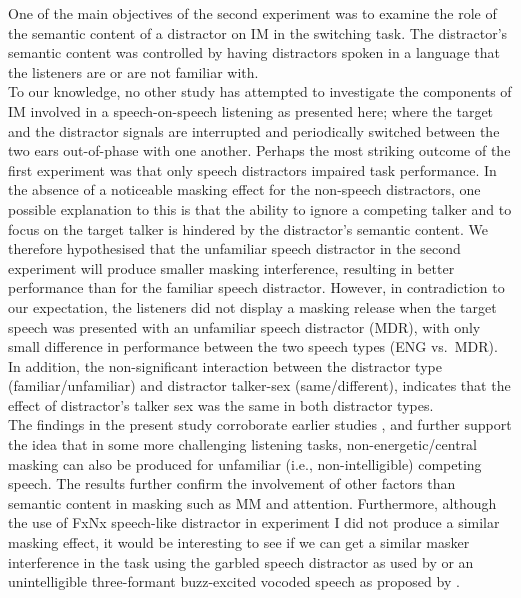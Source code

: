 \documentclass[a4paper, twoside]{templates/ociamthesis}
\begin{document}
\hfill\break
One of the main objectives of the second experiment was to examine the role of the semantic content of a distractor on IM in the switching task. The distractor's semantic content was controlled by having distractors spoken in a language that the listeners are or are not familiar with.\\

To our knowledge, no other study has attempted to investigate the components of IM involved in a speech-on-speech listening as presented here; where the target and the distractor signals are interrupted and periodically switched between the two ears out-of-phase with one another. Perhaps the most striking outcome of the first experiment was that only speech distractors impaired task performance. In the absence of a noticeable masking effect for the non-speech distractors, one possible explanation to this is that the ability to ignore a competing talker and to focus on the target talker is hindered by the distractor's semantic content. We therefore hypothesised that the unfamiliar speech distractor in the second experiment will produce smaller masking interference, resulting in better performance than for the familiar speech distractor. However, in contradiction to our expectation, the listeners did not display a masking release when the target speech was presented with an unfamiliar speech distractor (MDR), with only small difference in performance between the two speech types (ENG vs.~MDR). In addition, the non-significant interaction between the distractor type (familiar/unfamiliar) and distractor talker-sex (same/different), indicates that the effect of distractor's talker sex was the same in both distractor types.\\

The findings in the present study corroborate earlier studies \autocite{Freyman2001,Brungart2002,Carlile2015,Summers2020}, and further support the idea that in some more challenging listening tasks, non-energetic/central masking can also be produced for unfamiliar (i.e., non-intelligible) competing speech. The results further confirm the involvement of other factors than semantic content in masking such as MM and attention. Furthermore, although the use of FxNx speech-like distractor in experiment I did not produce a similar masking effect, it would be interesting to see if we can get a similar masker interference in the task using the garbled speech distractor as used by \textcite{Carlile2015} or an unintelligible three-formant buzz-excited vocoded speech as proposed by \textcite{Summers2020}.\\
\end{document}
